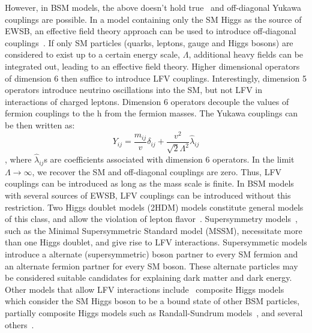 However, in BSM models, the above doesn't hold true~\cite{Harnik:2012pb} and off-diagonal Yukawa couplings are possible. In a model containing only the SM Higgs as the source of EWSB, an effective field theory approach can be used to introduce off-diagonal couplings~\cite{DiazCruz:1999xe}. If only SM particles (quarks, leptons, gauge and Higgs bosons) are considered to exist up to a certain energy scale, $\Lambda$, additional heavy fields can be integrated out, leading to an effective field theory. Higher dimensional operators of dimension 6 then suffice to introduce LFV couplings. Interestingly, dimension 5 operators introduce neutrino oscillations into the SM, but not LFV in interactions of charged leptons. Dimension 6 operators decouple the values of fermion couplings to the h from the fermion masses. The Yukawa couplings can be then written as:
\begin{equation*}
  Y_{ij}=\frac{m_{ij}}{v}\delta_{ij}+\frac{v^2}{\sqrt{2}\Lambda^2}\hat{\lambda}_{ij}
\end{equation*}
, where $\hat{\lambda}_{ij}$s are coefficients associated with dimension 6 operators. In the limit $\Lambda\rightarrow\infty$, we recover the SM and off-diagonal couplings are zero. Thus, LFV couplings can be introduced as long as the mass scale is finite.  In BSM models with several sources of EWSB, LFV couplings can be introduced without this restriction. Two Higgs doublet models (2HDM) models constitute general models of this class, and allow the violation of lepton flavor~\cite{PhysRevLett.38.622}. Supersymmetry models~\cite{Han:2000jz,Arganda:2004bz,Arhrib:2012ax,Arana-Catania:2013xma,Arganda:2015uca,Arganda:2015naa}, such as the Minimal Supersymmetric Standard model (MSSM), necessitate more than one Higgs doublet, and give rise to LFV interactions. Supersymmetic models introduce a alternate (supersymmetric) boson partner to every SM fermion and an alternate fermion partner for every SM boson. These alternate particles may be considered suitable candidates for explaining dark matter and dark energy. Other models that allow LFV interactions include~\cite{HIG-17-001} composite Higgs models~\cite{Agashe:2009di,Azatov:2009na} which consider the SM Higgs boson to be a bound state of other BSM particles, partially composite Higgs models such as Randall-Sundrum models~\cite{Perez:2008ee,Casagrande:2008hr,Buras:2009ka}, and several others~\cite{Blanke:2008zb,Giudice:2008uua,AguilarSaavedra:2009mx,Albrecht:2009xr,Goudelis:2011un,McKeen:2012av,Pilaftsis199268,PhysRevD.47.1080,Arganda:2014dta,Ishimori:2010au}.


